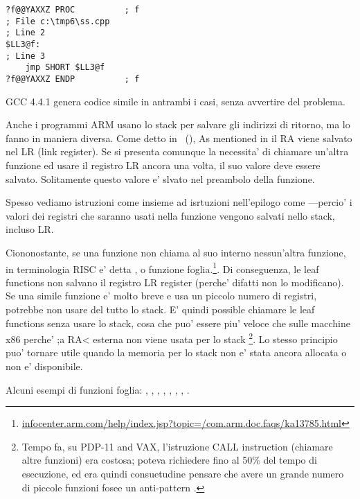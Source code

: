 \begin{lstlisting}[style=customasmx86]
?f@@YAXXZ PROC			; f
; File c:\tmp6\ss.cpp
; Line 2
$LL3@f:
; Line 3
	jmp	SHORT $LL3@f
?f@@YAXXZ ENDP			; f
\end{lstlisting}

GCC 4.4.1 genera codice simile in antrambi i casi, senza avvertire del problema.


Anche i programmi ARM usano lo stack per salvare gli indirizzi di ritorno, ma lo fanno in maniera diversa.
Come detto in \q{\HelloWorldSectionName}~(),
As mentioned in 
il \ac{RA} viene salvato nel \ac{LR} (\gls{link register}).
Se si presenta comunque la necessita' di chiamare un'altra funzione ed usare il registro \ac{LR} ancora una volta, 
il suo valore deve essere salvato.
Solitamente questo valore e' slvato nel preambolo della funzione.

Spesso vediamo istruzioni come  insieme ad isrtuzioni nell'epilogo come 
---percio' i valori dei registri che saranno usati nella funzione vengono salvati nello stack, incluso \ac{LR}.

Ciononostante, se una funzione non chiama al suo interno nessun'altra funzione, in terminologia \ac{RISC} e' detta 
, o funzione foglia.\footnote{\href{http://go.yurichev.com/17064}{infocenter.arm.com/help/index.jsp?topic=/com.arm.doc.faqs/ka13785.html}}. 
Di conseguenza, le leaf functions non salvano il registro \ac{LR} register (perche' difatti non lo modificano).
Se una simile funzione e' molto breve e usa un piccolo numero di registri, potrebbe non usare del tutto lo stack. 
E' quindi possible chiamare le leaf functions senza usare lo stack, cosa che puo' essere piu' veloce che sulle macchine x86 perche' ;a RA< esterna non viene usata per lo stack
\footnote{Tempo fa, su PDP-11 and VAX, l'istruzione CALL instruction (chiamare altre funzioni) era costosa; poteva richiedere fino al 50\%
del tempo di esecuzione, ed era quindi consuetudine pensare che avere un grande numero di piccole funzioni fosee un \gls{anti-pattern} .}.
Lo stesso principio puo' tornare utile quando la memoria per lo stack non e' stata ancora allocata o non e' disponibile.

Alcuni esempi di funzioni foglia:
, , 
, , ,
, , .
